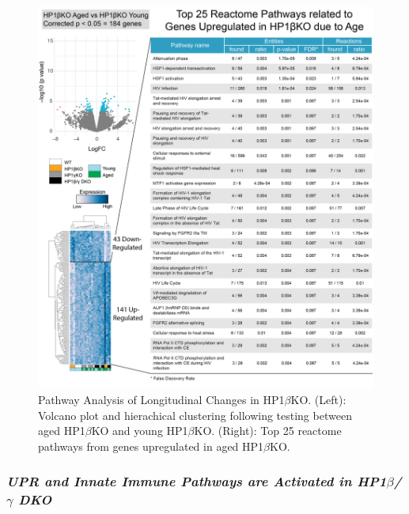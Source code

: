 \documentclass[onehalf,12pt]{beavtex}
\begin{document}
  \begin{figure}
  
  {\centering \includegraphics[width=1\linewidth, ]{./figure/results/BKO_long_reactome} 
  
  }
  
  \caption[Pathway Analysis of Longitudinal Changes in HP1$\beta$KO]{Pathway Analysis of Longitudinal Changes in HP1$\beta$KO. (Left): Volcano plot and hierachical clustering following testing between aged HP1$\beta$KO and young HP1$\beta$KO. (Right): Top 25 reactome pathways from genes upregulated in aged HP1$\beta$KO.}\label{fig:BKOreactome}
  \end{figure}
  
  \subsubsection*{\texorpdfstring{\emph{UPR and Innate Immune Pathways are
  Activated in HP1\(\beta\)/\(\gamma\)
  DKO}}{UPR and Innate Immune Pathways are Activated in HP1\textbackslash{}beta/\textbackslash{}gamma DKO}}\label{upr-and-innate-immune-pathways-are-activated-in-hp1betagamma-dko}
  
\end{document}
